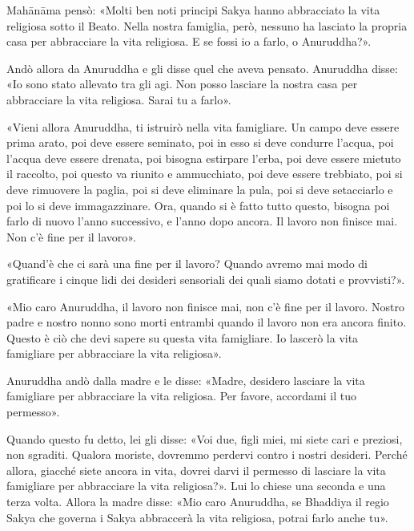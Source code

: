 Mahānāma pensò: «Molti ben noti principi Sakya hanno abbracciato la vita
religiosa sotto il Beato. Nella nostra famiglia, però, nessuno ha lasciato la
propria casa per abbracciare la vita religiosa. E se fossi io a farlo, o
Anuruddha?».

Andò allora da Anuruddha e gli disse quel che aveva pensato. Anuruddha disse:
«Io sono stato allevato tra gli agi. Non posso lasciare la nostra casa per
abbracciare la vita religiosa. Sarai tu a farlo».

«Vieni allora Anuruddha, ti istruirò nella vita famigliare. Un campo deve essere
prima arato, poi deve essere seminato, poi in esso si deve condurre l’acqua, poi
l’acqua deve essere drenata, poi bisogna estirpare l’erba, poi deve essere
mietuto il raccolto, poi questo va riunito e ammucchiato, poi deve essere
trebbiato, poi si deve rimuovere la paglia, poi si deve eliminare la pula, poi
si deve setacciarlo e poi lo si deve immagazzinare. Ora, quando si è fatto tutto
questo, bisogna poi farlo di nuovo l’anno successivo, e l’anno dopo ancora. Il
lavoro non finisce mai. Non c’è fine per il lavoro».

«Quand’è che ci sarà una fine per il lavoro? Quando avremo mai modo di
gratificare i cinque lidi dei desideri sensoriali dei quali siamo dotati e
provvisti?».

«Mio caro Anuruddha, il lavoro non finisce mai, non c’è fine per il lavoro.
Nostro padre e nostro nonno sono morti entrambi quando il lavoro non era ancora
finito. Questo è ciò che devi sapere su questa vita famigliare. Io lascerò la
vita famigliare per abbracciare la vita religiosa».

Anuruddha andò dalla madre e le disse: «Madre, desidero lasciare la vita
famigliare per abbracciare la vita religiosa. Per favore, accordami il tuo
permesso».

Quando questo fu detto, lei gli disse: «Voi due, figli miei, mi siete cari e
preziosi, non sgraditi. Qualora moriste, dovremmo perdervi contro i nostri
desideri. Perché allora, giacché siete ancora in vita, dovrei darvi il permesso
di lasciare la vita famigliare per abbracciare la vita religiosa?». Lui lo
chiese una seconda e una terza volta. Allora la madre disse: «Mio caro
Anuruddha, se Bhaddiya il regio Sakya che governa i Sakya abbraccerà la vita
religiosa, potrai farlo anche tu».

